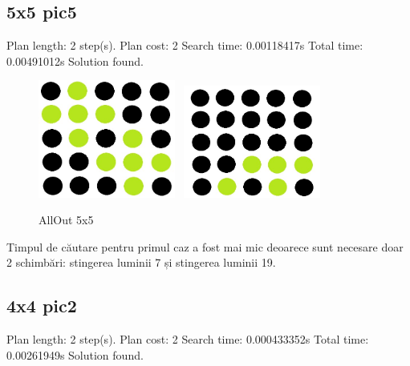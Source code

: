 \subsection{5x5 pic5} \newline
\newline
[t=0.00491012s, 10292 KB] Plan length: 2 step(s).
\newline
[t=0.00491012s, 10292 KB] Plan cost: 2
\newline
[t=0.00491012s, 10292 KB] Search time: 0.00118417s
\newline
[t=0.00491012s, 10292 KB] Total time: 0.00491012s
\newline
Solution found.
\newline
\newline
\newline
  \newline
  \newline
\begin{figure}[h]
\centering
 \includegraphics[width=0.4\textwidth]{text/images/pic4.jpeg}\
  \hfill
  \includegraphics[width=0.4\textwidth]{text/images/pic5.jpeg}\
   \newline
    \caption{AllOut 5x5}
\end{figure} \newline \newline
\newline
Timpul de căutare pentru primul caz a fost mai mic deoarece sunt necesare doar 2 schimbări: stingerea luminii 7 și stingerea luminii 19. 
\pagebreak



\subsection{4x4 pic2} \newline
\newline
[t=0.00261949s, 10292 KB] Plan length: 2 step(s).
\newline
[t=0.00261949s, 10292 KB] Plan cost: 2
\newline
[t=0.00261949s, 10292 KB] Search time: 0.000433352s
\newline
[t=0.00261949s, 10292 KB] Total time: 0.00261949s
\newline
Solution found.
\newline
